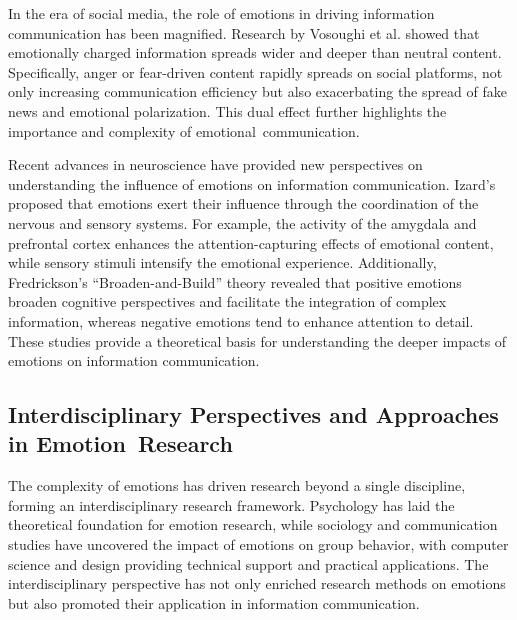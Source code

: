 In the era of social media, the role of emotions in driving information communication has been magnified. Research by Vosoughi et al. \cite{vosoughi2018spread} showed that emotionally charged information spreads wider and deeper than neutral content. Specifically, anger or fear-driven content rapidly spreads on social platforms, not only increasing communication efficiency but also exacerbating the spread of fake news and emotional polarization. This dual effect further highlights the importance and complexity of emotional~communication.

Recent advances in neuroscience have provided new perspectives on understanding the influence of emotions on information communication. Izard’s\cite{izard1993four} proposed that emotions exert their influence through the coordination of the nervous and sensory systems. For example, the activity of the amygdala and prefrontal cortex enhances the attention-capturing effects of emotional content, while sensory stimuli intensify the emotional experience. Additionally, Fredrickson’s \cite{fredrickson2001role} “Broaden-and-Build” theory revealed that positive emotions broaden cognitive perspectives and facilitate the integration of complex information, whereas negative emotions tend to enhance attention to detail. These studies provide a theoretical basis for understanding the deeper impacts of emotions on information communication.


\subsection{Interdisciplinary Perspectives and Approaches in Emotion~Research}%
The complexity of emotions has driven research beyond a single discipline, forming an interdisciplinary research framework. Psychology has laid the theoretical foundation for emotion research, while sociology and communication studies have uncovered the impact of emotions on group behavior, with computer science and design providing technical support and practical applications. The interdisciplinary perspective has not only enriched research methods on emotions but also promoted their application in information communication.

